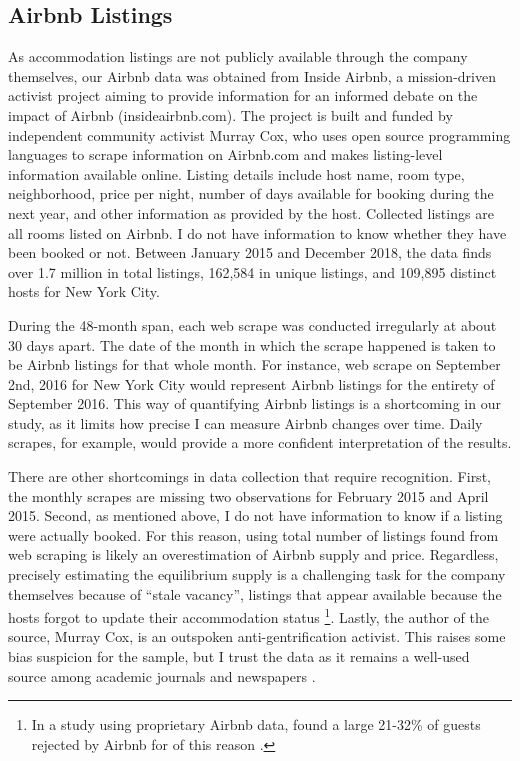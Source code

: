 \documentclass[12pt]{article}
\begin{document}
		\subsection{Airbnb Listings}
			As accommodation listings are not publicly available through the company themselves, our Airbnb data was obtained from Inside Airbnb, a mission-driven activist project aiming to provide information for an informed debate on the impact of Airbnb (insideairbnb.com). The project is built and funded by independent community activist Murray Cox, who uses open source programming languages to scrape information on Airbnb.com and makes listing-level information available online. Listing details include host name, room type, neighborhood, price per night, number of days available for booking during the next year, and other information as provided by the host. Collected listings are all rooms listed on Airbnb. I do not have information to know whether they have been booked or not. Between January 2015 and December 2018, the data finds over 1.7 million in total listings, 162,584 in unique listings, and 109,895 distinct hosts for New York City. 
			
			\par
			During the 48-month span, each web scrape was conducted irregularly at about 30 days apart. The date of the month in which the scrape happened is taken to be Airbnb listings for that whole month. For instance, web scrape on September 2nd, 2016 for New York City would represent Airbnb listings for the entirety of September 2016. This way of quantifying Airbnb listings is a shortcoming in our study, as it limits how precise I can measure Airbnb changes over time. Daily scrapes, for example, would provide a more confident interpretation of the results.
			
			\par
			There are other shortcomings in data collection that require recognition. First, the monthly scrapes are missing two observations for February 2015 and April 2015. Second, as mentioned above, I do not have information to know if a listing were actually booked. For this reason, using total number of listings found from web scraping is likely an overestimation of Airbnb supply and price. Regardless, precisely estimating the equilibrium supply is a challenging task for the company themselves because of “stale vacancy”, listings that appear available because the hosts forgot to update their accommodation status \footnote{In a study using proprietary Airbnb data, \citet{fradkin2014reporting} found a large 21-32\% of guests rejected by Airbnb for of this reason \citep{zervas2017rise}.}. Lastly, the author of the source, Murray Cox, is an outspoken anti-gentrification activist. This raises some bias suspicion for the sample, but I trust the data as it remains a well-used source among academic journals and newspapers \citep{coles2017airbnb, gurran2017tourists, kakar2018visible}.
\end{document}
